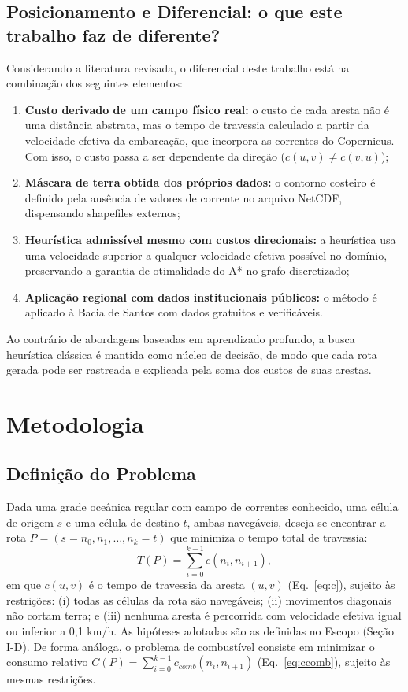 \documentclass[conference]{IEEEtran}
\begin{document}
\subsection{Posicionamento e Diferencial: o que este trabalho faz de diferente?}
Considerando a literatura revisada, o diferencial deste trabalho está na combinação dos seguintes elementos:
\begin{enumerate}
\item \textbf{Custo derivado de um campo físico real:} o custo de cada aresta não é uma distância abstrata, mas o tempo de travessia calculado a partir da velocidade efetiva da embarcação, que incorpora as correntes do Copernicus. Com isso, o custo passa a ser dependente da direção ($c(u,v) \neq c(v,u)$);
\item \textbf{Máscara de terra obtida dos próprios dados:} o contorno costeiro é definido pela ausência de valores de corrente no arquivo NetCDF, dispensando shapefiles externos;
\item \textbf{Heurística admissível mesmo com custos direcionais:} a heurística usa uma velocidade superior a qualquer velocidade efetiva possível no domínio, preservando a garantia de otimalidade do A* \cite{hart} no grafo discretizado;
\item \textbf{Aplicação regional com dados institucionais públicos:} o método é aplicado à Bacia de Santos com dados gratuitos e verificáveis.
\end{enumerate}
Ao contrário de abordagens baseadas em aprendizado profundo, a busca heurística clássica é mantida como núcleo de decisão, de modo que cada rota gerada pode ser rastreada e explicada pela soma dos custos de suas arestas.

\section{Metodologia}
\subsection{Definição do Problema}
Dada uma grade oceânica regular com campo de correntes conhecido, uma célula de origem $s$ e uma célula de destino $t$, ambas navegáveis, deseja-se encontrar a rota $P = (s = n_0, n_1, \ldots, n_k = t)$ que minimiza o tempo total de travessia:
\begin{equation}
T(P) = \sum_{i=0}^{k-1} c(n_i, n_{i+1}),
\label{eq:T}
\end{equation}
em que $c(u,v)$ é o tempo de travessia da aresta $(u,v)$ (Eq.~\ref{eq:c}), sujeito às restrições: (i) todas as células da rota são navegáveis; (ii) movimentos diagonais não cortam terra; e (iii) nenhuma aresta é percorrida com velocidade efetiva igual ou inferior a 0,1 km/h. As hipóteses adotadas são as definidas no Escopo (Seção I-D). De forma análoga, o problema de combustível consiste em minimizar o consumo relativo $C(P) = \sum_{i=0}^{k-1} c_{comb}(n_i, n_{i+1})$ (Eq.~\ref{eq:ccomb}), sujeito às mesmas restrições.
\end{document}
